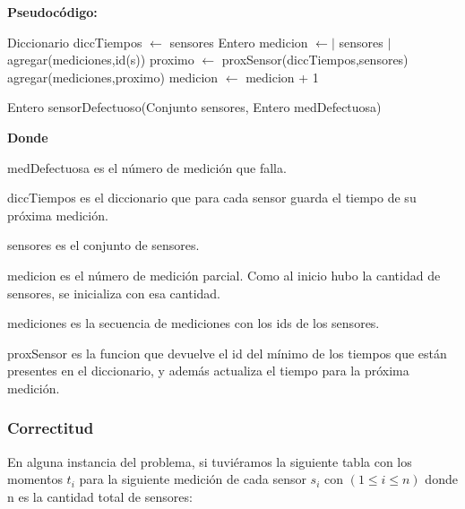 \quad


\textbf{Pseudoc\'odigo:}

\begin{algorithm}[H]
\begin{algorithmic}[1]
\STATE Diccionario diccTiempos  \quad $ \gets $ \quad sensores
\STATE Entero medicion $ \gets \vert$ sensores $ \vert $
\STATE agregar(mediciones,id(s))
\ENDFOR
{}
\STATE proximo \quad $ \gets $ \quad proxSensor(diccTiempos,sensores)
\STATE agregar(mediciones,proximo)
\STATE medicion $ \gets $ medicion + 1
\ENDWHILE
\end{algorithmic}
\caption{Entero sensorDefectuoso(Conjunto sensores, Entero medDefectuosa)}\label{probConjK}
\end{algorithm}


\quad


\textbf{Donde}


\quad \quad \quad medDefectuosa es el n\'umero de medici\'on que falla.

\quad


\quad \quad \quad diccTiempos es el diccionario que para cada sensor guarda el tiempo de su pr\'oxima medici\'on.

\quad


\quad \quad \quad sensores es el conjunto de sensores.


\quad

\quad \quad \quad medicion es el n\'umero de medici\'on parcial. Como al inicio hubo la cantidad de sensores, se inicializa con esa cantidad.


\quad

\quad \quad \quad mediciones es la secuencia de mediciones con los ids de los sensores.


\quad

\quad \quad \quad proxSensor es la funcion que devuelve el id del m\'inimo de los tiempos que est\'an presentes en el diccionario, y adem\'as actualiza el tiempo para la pr\'oxima medici\'on.


\subsubsection{Correctitud}

\quad En alguna instancia del problema, si tuvi\'eramos la siguiente tabla con los momentos $ t_i $ para la siguiente medici\'on de cada sensor $ s_i $ con \quad  $ (1 \leq i \leq n)$ \quad donde n es la cantidad total de sensores:


